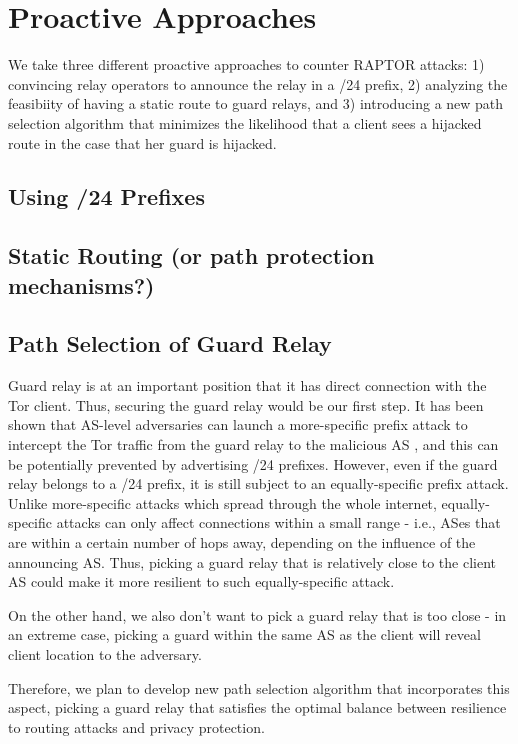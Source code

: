 \section{Proactive Approaches}
We take three different proactive approaches to counter RAPTOR attacks: 1) convincing relay operators to announce the relay in a /24 prefix, 2) analyzing the feasibiity of having a static route to guard relays, and 3) introducing a new path selection algorithm that minimizes the likelihood that a client sees a hijacked route in the case that her guard is hijacked.

\subsection{Using /24 Prefixes}

\subsection{Static Routing (or path protection mechanisms?)}

\subsection{Path Selection of Guard Relay}

Guard relay is at an important position that it has direct connection with the Tor client. Thus, securing the guard relay would be our first step. It has been shown that AS-level adversaries can launch a more-specific prefix attack to intercept the Tor traffic from the guard relay to the malicious AS \cite{sun2015raptor}, and this can be potentially prevented by advertising /24 prefixes. However, even if the guard relay belongs to a /24 prefix, it is still subject to an equally-specific prefix attack. Unlike more-specific attacks which spread through the whole internet, equally-specific attacks can only affect connections within a small range - i.e., ASes that are within a certain number of hops away, depending on the influence of the announcing AS. Thus, picking a guard relay that is relatively close to the client AS could make it more resilient to such equally-specific attack.

On the other hand, we also don't want to pick a guard relay that is too close - in an extreme case, picking a guard within the same AS as the client will reveal client location to the adversary. 

Therefore, we plan to develop new path selection algorithm that incorporates this aspect, picking a guard relay that satisfies the optimal balance between resilience to routing attacks and privacy protection. 
